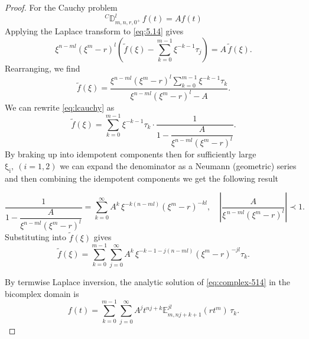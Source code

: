 \documentclass[a4paper,12pt]{article}
\theoremstyle{remark}
\begin{document}
\begin{proof}
For the Cauchy problem \begin{equation} \label{eq:5.14}
^{C}\mathbb{D}^{l}_{m,n,r,0^+} \, f(t) = A f(t)
\end{equation} 
    	Applying the Laplace transform to \eqref{eq:5.14} gives
	\[
	\xi^{n-ml}(\xi^{m}-r)^{l}
	\left(\tilde{f}(\xi) - \sum_{k=0}^{m-1}\xi^{-k-1}\tau_j\right)
	= A\,\tilde{f}(\xi).
	\]
	Rearranging, we find
	\begin{equation}\label{eq:lcauchy}  
	\tilde{f}(\xi)
	= \frac{\xi^{n-ml}(\xi^{m}-r)^{l}
		\sum_{k=0}^{m-1}\xi^{-k-1}\tau_k}
	{\xi^{n-ml}(\xi^{m}-r)^{l}-A}.	\end{equation}
	We can rewrite \eqref{eq:lcauchy} as
	\[
	\tilde{f}(\xi)
	= \sum_{k=0}^{m-1}\xi^{-k-1}\tau_k
	\cdot \frac{1}{1-\dfrac{A}{\xi ^{n-ml}(\xi^{m}-r)^{l}}}.
	\]
By braking up into idempotent components then for sufficiently large $\operatorname{\xi_i},~(i=1,2)$ we can expand the denominator as a Neumann (geometric) series and then combining the  idempotent components we get the following result

	\[
	\frac{1}{1-\dfrac{A}{\xi^{n-ml}(\xi^{m}-r)^{l}}}
	= \sum_{k=0}^{\infty}A^k\,\xi^{-k(n-ml)}(\xi^{m}-r)^{-kl}, \quad 
\left| \frac{A}{\xi^{\,n - m l} \left( \xi^{m} - r \right)^{l}} \right| \prec 1.	\]
	Substituting into \(\tilde{f}(\xi)\) gives
	\begin{equation}
	\tilde{f}(\xi)
	= \sum_{k=0}^{m-1}\sum_{j=0}^{\infty}
	A^k\,\xi^{-k-1-j(n-ml)}(\xi^{m}-r)^{-jl}\tau_k.
	\label{eq:complex-514}
	\end{equation}

By termwise Laplace inversion, the analytic solution of \eqref{eq:complex-514} in the bicomplex domain is
	\begin{equation}
		f(t)
		= \sum_{k=0}^{m-1}\sum_{j=0}^{\infty}
		A^{j}t^{n j + k}
		\mathbb{E}^{jl}_{m,n j + k +1}(r t^{m})\,\tau_k.
	\end{equation}
    \end{proof}
\end{document}
